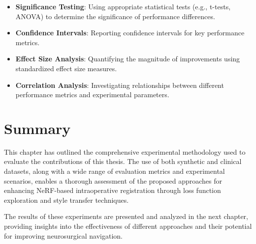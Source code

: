 \begin{itemize}
    \item \textbf{Significance Testing}: Using appropriate statistical tests (e.g., t-tests, ANOVA) to determine the significance of performance differences.
    
    \item \textbf{Confidence Intervals}: Reporting confidence intervals for key performance metrics.
    
    \item \textbf{Effect Size Analysis}: Quantifying the magnitude of improvements using standardized effect size measures.
    
    \item \textbf{Correlation Analysis}: Investigating relationships between different performance metrics and experimental parameters.
\end{itemize}

\section{Summary}

This chapter has outlined the comprehensive experimental methodology used to evaluate the contributions of this thesis. The use of both synthetic and clinical datasets, along with a wide range of evaluation metrics and experimental scenarios, enables a thorough assessment of the proposed approaches for enhancing NeRF-based intraoperative registration through loss function exploration and style transfer techniques.

The results of these experiments are presented and analyzed in the next chapter, providing insights into the effectiveness of different approaches and their potential for improving neurosurgical navigation. 